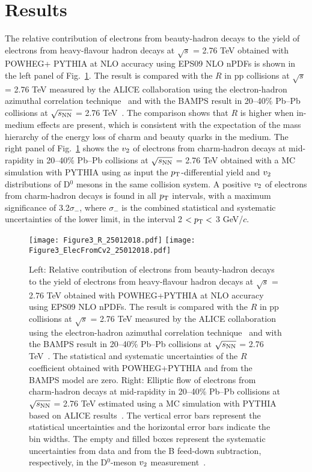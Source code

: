 \documentclass[11pt,a4paper]{article}
\providecommand{\pT}{$p_{\rm T}$ }
\providecommand{\vtwo}{$v_{\rm 2}$ }
\providecommand{\s}{$\sqrt{s}$ }
\providecommand{\snn}{$\sqrt{s_{\rm NN}}$ }
\begin{document}
\section{Results}
\label{Sec:Results}

The relative contribution of electrons from beauty-hadron decays to the yield of electrons from heavy-flavour hadron decays at \s = 2.76 TeV obtained with POWHEG+  PYTHIA at NLO accuracy using EPS09 NLO nPDFs is shown in the left panel of Fig.~\ref{fig:R_cbEv2_cEv2}. The result is compared with the $R$ in pp collisions at  \s = 2.76 TeV measured by the ALICE collaboration using the electron-hadron azimuthal correlation technique~\cite{Abelev:2014hla,2016507} and with the BAMPS result in 20--40\%  Pb--Pb collisions at \snn = 2.76 TeV~\cite{Uphoff:2014hza}. The comparison shows that $R$ is higher when in-medium effects are present, which is consistent with the expectation of the mass hierarchy of the energy loss of charm and beauty quarks in the medium.
The right panel of Fig.~\ref{fig:R_cbEv2_cEv2} shows the \vtwo of electrons from charm-hadron decays at mid-rapidity in 20--40\%  Pb--Pb collisions at \snn = 2.76 TeV obtained with a MC simulation with PYTHIA using as input the $p_{\rm T}$-differential yield and \vtwo distributions of D$^{0}$ mesons  in the same collision system. A positive \vtwo of electrons from charm-hadron decays is found in all \pT intervals, with a  maximum significance of 3.2$\sigma_{-}$, where $\sigma_{-}$ is the combined statistical and systematic uncertainties of the lower limit,  in the interval 2 $<  p_{\rm T} <$ 3 GeV/$c$.

\begin{figure}
\centering
  \texttt{[image: Figure3\_R\_25012018.pdf]}
    \texttt{[image: Figure3\_ElecFromCv2\_25012018.pdf]}
  \caption{Left:  Relative contribution of electrons from beauty-hadron decays to the yield of electrons from heavy-flavour hadron decays at \s = 2.76 TeV obtained with POWHEG+PYTHIA at NLO accuracy  using  EPS09 NLO nPDFs. The result is compared with the $R$ in pp collisions at  \s = 2.76 TeV measured by the ALICE collaboration using the electron-hadron azimuthal correlation technique~\cite{Abelev:2014hla,2016507} and with the BAMPS result in 20--40\%  Pb--Pb collisions at \snn = 2.76 TeV~\cite{Uphoff:2014hza}. The statistical and systematic uncertainties of the $R$ coefficient obtained with POWHEG+PYTHIA and from the BAMPS  model are zero.  Right: Elliptic flow of electrons from charm-hadron decays at mid-rapidity  in 20--40\%  Pb--Pb collisions at \snn = 2.76 TeV estimated using a MC simulation with PYTHIA based on ALICE results~\cite{ALICEDRPbPb,Abelev:2014ipa}. 
The vertical error bars represent the statistical uncertainties and the horizontal error bars indicate the bin widths. The empty and filled boxes represent the systematic uncertainties from data and from the B feed-down subtraction, respectively, in the D$^0$-meson \vtwo measurement~\cite{Abelev:2014ipa}.}
   \label{fig:R_cbEv2_cEv2}
\end{figure}
\end{document}
